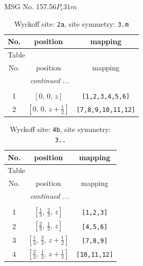 \documentclass[fleqn,8pt]{jsarticle}
\begin{document}
\setcounter{MaxMatrixCols}{32}

\renewcommand{\tablename}{Table~}
\renewcommand{\figurename}{Figure~}
\begin{center}
\LARGE
MSG No. 157.56\quad$P_{c}31m$
\end{center}
\renewcommand{\arraystretch}{1.2}
\begin{longtable}{ccc}
\caption{Wyckoff site: {\tt 2a}, site symmetry: {\tt 3.m}}
 \\
 \hline \hline
No. & position & mapping \\ \hline \endfirsthead

\multicolumn{2}{l}{\tablename\ \thetable{}} \\
 \hline \hline
No. & position & mapping \\ \hline \endhead

 \hline \hline
\multicolumn{2}{r}{\footnotesize\it continued ...} \\ \endfoot

 \hline \hline
\multicolumn{2}{r}{} \\ \endlastfoot

1 & $\left[ 0,\, 0,\, z \right]$ & {\tt [1,2,3,4,5,6]} \\ \hline
2 & $\left[ 0,\, 0,\, z + \frac{1}{2} \right]$ & {\tt [7,8,9,10,11,12]} \\
\end{longtable}
\renewcommand{\arraystretch}{1.2}
\begin{longtable}{ccc}
\caption{Wyckoff site: {\tt 4b}, site symmetry: {\tt 3..}}
 \\
 \hline \hline
No. & position & mapping \\ \hline \endfirsthead

\multicolumn{2}{l}{\tablename\ \thetable{}} \\
 \hline \hline
No. & position & mapping \\ \hline \endhead

 \hline \hline
\multicolumn{2}{r}{\footnotesize\it continued ...} \\ \endfoot

 \hline \hline
\multicolumn{2}{r}{} \\ \endlastfoot

1 & $\left[ \frac{1}{3},\, \frac{2}{3},\, z \right]$ & {\tt [1,2,3]} \\ \hline
2 & $\left[ \frac{2}{3},\, \frac{1}{3},\, z \right]$ & {\tt [4,5,6]} \\ \hline
3 & $\left[ \frac{1}{3},\, \frac{2}{3},\, z + \frac{1}{2} \right]$ & {\tt [7,8,9]} \\ \hline
4 & $\left[ \frac{2}{3},\, \frac{1}{3},\, z + \frac{1}{2} \right]$ & {\tt [10,11,12]} \\
\end{longtable}
\end{document}
